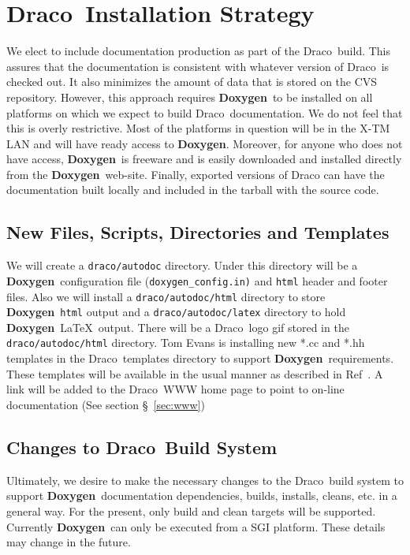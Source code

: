 \documentclass[11pt]{nmemo}
\newcommand{\draco}{{\normalfont\sffamily Draco}}
\newcommand{\doxy}{{\normalfont\bfseries Doxygen}}
\begin{document}

\section{\draco\ Installation Strategy}
\label{sec:draco}

We elect to include documentation
production as part of the \draco\ build. This assures that the
documentation is consistent with whatever version of \draco\ is
checked out. It also minimizes the amount of data that is stored on
the CVS repository. However, this approach requires
\doxy\ to be installed on all platforms on which we expect to build
\draco\ documentation.  We do not feel that this is overly restrictive.
Most of the platforms in question will be in the X-TM LAN and will have ready 
access to \doxy. Moreover, for anyone who does not
have access, \doxy\ is freeware and is easily downloaded and
installed directly from the \doxy\ web-site.
Finally, exported versions of Draco can have the documentation
built locally and included in the tarball with the source code. 

\subsection{New Files, Scripts, Directories and Templates}
We will create a \texttt{draco/autodoc} directory. Under this directory
will be a \doxy\ configuration file (\texttt{doxygen\_config.in)} and
 \texttt{html} header and footer files. Also we will install 
a \texttt{draco/autodoc/html} directory to store \doxy\ \texttt{html}
output and a \texttt{draco/autodoc/latex}
directory to hold \doxy\ \LaTeX\ output. There will be a \draco\ logo gif
stored in the \texttt{draco/autodoc/html} directory. 
Tom Evans is installing new *.cc and *.hh templates in the \draco\ 
templates directory to support \doxy\ requirements. These templates
will be available in the usual manner as described in Ref~\cite{xtm:9909}.
A link will be added to the \draco\ WWW home page to point to on-line
documentation (See section \S~\ref{sec:www})

\subsection{Changes to \draco\ Build System}

Ultimately, we desire to make the necessary changes to the \draco\
build system to support \doxy\ documentation dependencies,
builds, installs, cleans,
etc. in a general way. For the present, 
only build and clean targets will be supported.
Currently \doxy\
can only be executed from a SGI platform. These details may
change in the future. 
\end{document}
